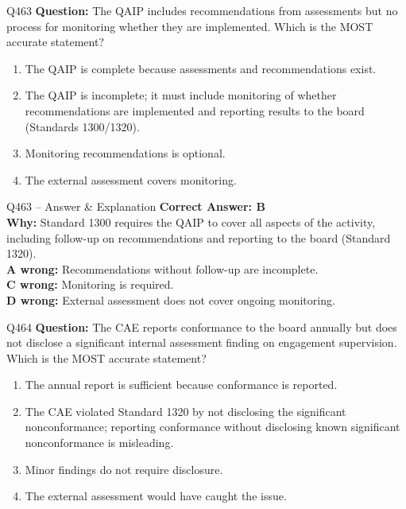 \documentclass[aspectratio=169,10pt]{beamer}
\begin{document}
	\begin{frame}[t]{Q463}
		\small
		\textbf{Question:} The QAIP includes recommendations from assessments but no process for monitoring whether they are implemented. Which is the MOST accurate statement?
		\begin{enumerate}[label=\Alph*.,itemsep=1pt,topsep=2pt]
			\item The QAIP is complete because assessments and recommendations exist.
			\item The QAIP is incomplete; it must include monitoring of whether recommendations are implemented and reporting results to the board (Standards 1300/1320).
			\item Monitoring recommendations is optional.
			\item The external assessment covers monitoring.
		\end{enumerate}
	\end{frame}
	
	\begin{frame}[t]{Q463 -- Answer \& Explanation}
		\small
		\textbf{Correct Answer: B} \\[4pt]
		\textbf{Why:} Standard 1300 requires the QAIP to cover all aspects of the activity, including follow-up on recommendations and reporting to the board (Standard 1320). \\[4pt]
		\textbf{A wrong:} Recommendations without follow-up are incomplete. \\[2pt]
		\textbf{C wrong:} Monitoring is required. \\[2pt]
		\textbf{D wrong:} External assessment does not cover ongoing monitoring.
	\end{frame}
	
	\begin{frame}[t]{Q464}
		\small
		\textbf{Question:} The CAE reports conformance to the board annually but does not disclose a significant internal assessment finding on engagement supervision. Which is the MOST accurate statement?
		\begin{enumerate}[label=\Alph*.,itemsep=1pt,topsep=2pt]
			\item The annual report is sufficient because conformance is reported.
			\item The CAE violated Standard 1320 by not disclosing the significant nonconformance; reporting conformance without disclosing known significant nonconformance is misleading.
			\item Minor findings do not require disclosure.
			\item The external assessment would have caught the issue.
		\end{enumerate}
	\end{frame}
	
\end{document}
